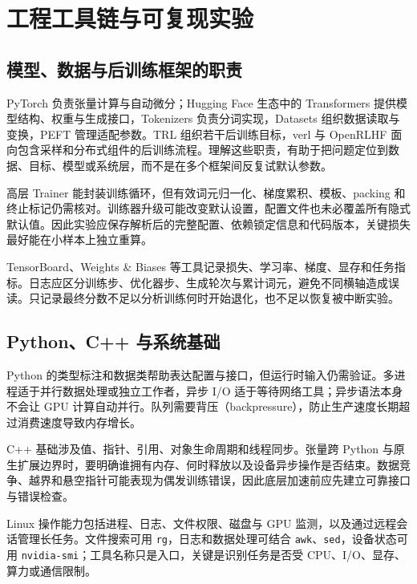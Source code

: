 \setcounter{chapter}{28} %
\chapter{工程工具链与可复现实验}
\label{ch:engineering}

\section{模型、数据与后训练框架的职责}

PyTorch 负责张量计算与自动微分；Hugging Face 生态中的 Transformers 提供模型结构、权重与生成接口，Tokenizers 负责分词实现，Datasets 组织数据读取与变换，PEFT 管理适配参数。TRL 组织若干后训练目标，verl 与 OpenRLHF 面向包含采样和分布式组件的后训练流程。理解这些职责，有助于把问题定位到数据、目标、模型或系统层，而不是在多个框架间反复试默认参数。

高层 Trainer 能封装训练循环，但有效词元归一化、梯度累积、模板、packing 和终止标记仍需核对。训练器升级可能改变默认设置，配置文件也未必覆盖所有隐式默认值。因此实验应保存解析后的完整配置、依赖锁定信息和代码版本，关键损失最好能在小样本上独立重算。

TensorBoard、Weights \& Biases 等工具记录损失、学习率、梯度、显存和任务指标。日志应区分训练步、优化器步、生成轮次与累计词元，避免不同横轴造成误读。只记录最终分数不足以分析训练何时开始退化，也不足以恢复被中断实验。

\section{Python、C++ 与系统基础}

Python 的类型标注和数据类帮助表达配置与接口，但运行时输入仍需验证。多进程适于并行数据处理或独立工作者，异步 I/O 适于等待网络工具；异步语法本身不会让 GPU 计算自动并行。队列需要背压（backpressure），防止生产速度长期超过消费速度导致内存增长。

C++ 基础涉及值、指针、引用、对象生命周期和线程同步。张量跨 Python 与原生扩展边界时，要明确谁拥有内存、何时释放以及设备异步操作是否结束。数据竞争、越界和悬空指针可能表现为偶发训练错误，因此底层加速前应先建立可靠接口与错误检查。

Linux 操作能力包括进程、日志、文件权限、磁盘与 GPU 监测，以及通过远程会话管理长任务。文件搜索可用 \texttt{rg}，日志和数据处理可结合 \texttt{awk}、\texttt{sed}，设备状态可用 \texttt{nvidia-smi}；工具名称只是入口，关键是识别任务是否受 CPU、I/O、显存、算力或通信限制。

